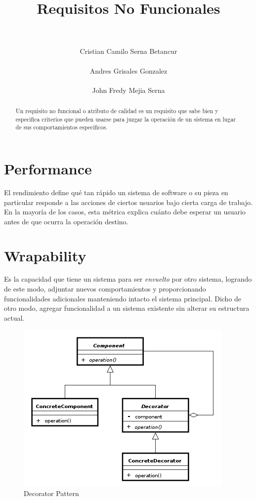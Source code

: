 \documentclass[a4paper,11pt]{article}
\title{\LARGE \bf 
    Requisitos No Funcionales
}
\author{\\\\ Cristian Camilo Serna Betancur \\\\ Andres Grisales Gonzalez  
\\\\ John Fredy Mejia Serna}
\begin{document}
\maketitle
\tableofcontents
\begin{abstract}
    Un requisito no funcional o atributo de calidad es un requisito que sabe 
    bien y especifica criterios que pueden usarse para juzgar la operación de 
    un sistema en lugar de sus comportamientos específicos.\cite{DEFINITION}
\end{abstract}

\section{Performance}
El rendimiento define qué tan rápido un sistema de software o su pieza en 
particular responde a las acciones de ciertos usuarios bajo cierta carga de 
trabajo. En la mayoría de los casos, esta métrica explica cuánto debe esperar 
un usuario antes de que ocurra la operación destino.

\section{Wrapability}
Es la capacidad que tiene un sistema para ser \emph{envuelto} por otro sistema, 
logrando de este modo, adjuntar nuevos comportamientos y proporcionando 
funcionalidades adicionales manteniendo intacto el sistema principal. Dicho de 
otro modo, agregar funcionalidad a un sistema existente sin alterar su 
estructura actual.

\begin{figure}[!h]
    \centering
    \includegraphics[scale=.7]{assets/decorator.png}
    \caption{Decorator Pattern}
\end{figure}
\end{document}
